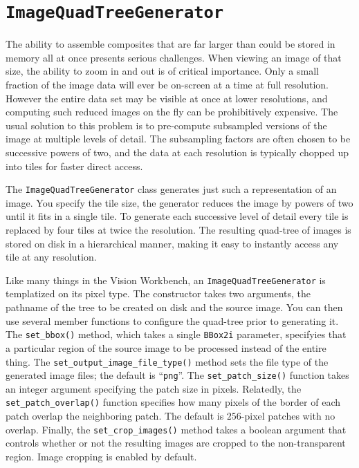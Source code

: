 \section{{\tt ImageQuadTreeGenerator}}\label{sec:quadtreegenerator}

The ability to assemble composites that are far larger than could be stored 
in memory all at once presents serious challenges.  When viewing an image 
of that size, the ability to zoom in and out is of critical importance.  
Only a small fraction of the image data will ever be on-screen at a time 
at full resolution.  However the entire data set may be visible at once at 
lower resolutions, and computing such reduced images on the fly can be 
prohibitively expensive.  The usual solution to this problem is to 
pre-compute subsampled versions of the image at multiple levels of detail. 
The subsampling factors are often chosen to be successive powers of two, 
and the data at each resolution is typically chopped up into tiles for 
faster direct access.

The \verb#ImageQuadTreeGenerator# class generates just such a representation 
of an image.  You specify the tile size, the generator reduces the 
image by powers of two until it fits in a single tile.  To generate 
each successive level of detail every tile is replaced by four tiles 
at twice the resolution.  The resulting quad-tree of images is stored 
on disk in a hierarchical manner, making it easy to instantly access any 
tile at any resolution.

Like many things in the Vision Workbench, an \verb#ImageQuadTreeGenerator# 
is templatized on its pixel type.  The constructor takes two arguments, 
the pathname of the tree to be created on disk and the source image. 
You can then use several member functions to configure the quad-tree 
prior to generating it.  The \verb#set_bbox()# method, which takes a 
single \verb#BBox2i# parameter, specifyies that a particular region of 
the source image to be processed instead of the entire thing.  The 
\verb#set_output_image_file_type()# method sets the file type of the 
generated image files; the default is ``\verb#png#''.  The 
\verb#set_patch_size()# function takes an integer argument specifying 
the patch size in pixels.  Relatedly, the \verb#set_patch_overlap()# 
function specifies how many pixels of the border of each patch overlap 
the neighboring patch.  The default is $256$-pixel patches with no 
overlap.  Finally, the \verb#set_crop_images()# method takes a 
boolean argument that controls whether or not the resulting images 
are cropped to the non-transparent region.  Image cropping is enabled 
by default.

